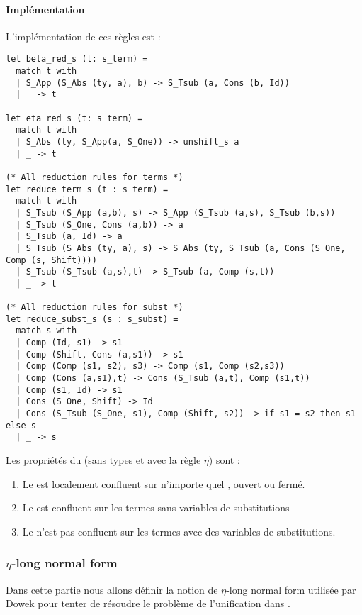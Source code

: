 \paragraph{Implémentation}

L'implémentation de ces règles est :
\begin{lstlisting}
let beta_red_s (t: s_term) =
  match t with
  | S_App (S_Abs (ty, a), b) -> S_Tsub (a, Cons (b, Id))
  | _ -> t

let eta_red_s (t: s_term) =
  match t with
  | S_Abs (ty, S_App(a, S_One)) -> unshift_s a
  | _ -> t

(* All reduction rules for terms *)
let reduce_term_s (t : s_term) =
  match t with
  | S_Tsub (S_App (a,b), s) -> S_App (S_Tsub (a,s), S_Tsub (b,s))
  | S_Tsub (S_One, Cons (a,b)) -> a
  | S_Tsub (a, Id) -> a
  | S_Tsub (S_Abs (ty, a), s) -> S_Abs (ty, S_Tsub (a, Cons (S_One, Comp (s, Shift))))
  | S_Tsub (S_Tsub (a,s),t) -> S_Tsub (a, Comp (s,t))
  | _ -> t

(* All reduction rules for subst *)
let reduce_subst_s (s : s_subst) =
  match s with
  | Comp (Id, s1) -> s1
  | Comp (Shift, Cons (a,s1)) -> s1
  | Comp (Comp (s1, s2), s3) -> Comp (s1, Comp (s2,s3))
  | Comp (Cons (a,s1),t) -> Cons (S_Tsub (a,t), Comp (s1,t))
  | Comp (s1, Id) -> s1
  | Cons (S_One, Shift) -> Id
  | Cons (S_Tsub (S_One, s1), Comp (Shift, s2)) -> if s1 = s2 then s1 else s
  | _ -> s
\end{lstlisting}

\begin{prop}
Les propriétés du \lsc{} (sans types et avec la règle $\eta$) sont :
\begin{enumerate}
    \item Le \lsc{} est localement confluent sur n'importe quel \lsterm{}, ouvert ou fermé.
    \item Le \lsc{} est confluent sur les termes sans variables de substitutions
    \item Le \lsc{} n'est pas confluent sur les termes avec des variables de substitutions.
\end{enumerate}
\end{prop}

\subsubsection{$\eta$-long normal form}
Dans cette partie nous allons définir la notion de $\eta$-long normal form utilisée par Dowek pour tenter de résoudre le problème de l'unification dans \cite{dowek1995higher}.

